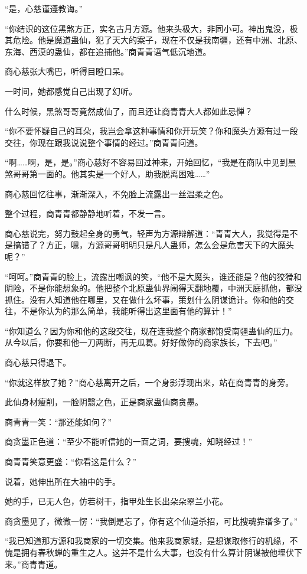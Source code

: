 \begin{this_body}
“是，心慈谨遵教诲。”

“你结识的这位黑煞方正，实名古月方源。他来头极大，非同小可。神出鬼没，极其危险。他是魔道蛊仙，犯了天大的案子，现在不仅是我南疆，还有中洲、北原、东海、西漠的蛊仙，都在追捕他。”商青青语气低沉地道。

商心慈张大嘴巴，听得目瞪口呆。

一时间，她都感觉自己出现了幻听。

什么时候，黑煞哥哥竟然成仙了，而且还让商青青大人都如此忌惮？

“你不要怀疑自己的耳朵，我岂会拿这种事情和你开玩笑？你和魔头方源有过一段交往，你现在跟我说说整个事情的经过。”商青青问道。

“啊……啊，是，是。”商心慈好不容易回过神来，开始回忆，“我是在商队中见到黑煞哥哥第一面的。他其实是一个好人，助我脱离困难……”

商心慈回忆往事，渐渐深入，不免脸上流露出一丝温柔之色。

整个过程，商青青都静静地听着，不发一言。

商心慈说完，努力鼓起全身的勇气，轻声为方源辩解道：“青青大人，我觉得是不是搞错了？方正，嗯，方源哥哥明明只是凡人蛊师，怎么会是危害天下的大魔头呢？”

“呵呵。”商青青的脸上，流露出嘲讽的笑，“他不是大魔头，谁还能是？他的狡猾和阴险，不是你能想象的。他把整个北原蛊仙界闹得天翻地覆，中洲天庭抓他，都没抓住。没有人知道他在哪里，又在做什么坏事，策划什么阴谋诡计。你和他的交往，不是你认为的那么简单，我能听得出这里面有他的算计！”

“你知道么？因为你和他的这段交往，现在连我整个商家都饱受南疆蛊仙的压力。从今以后，你要和他一刀两断，再无瓜葛。好好做你的商家族长，下去吧。”

商心慈只得退下。

“你就这样放了她？”商心慈离开之后，一个身影浮现出来，站在商青青的身旁。

此仙身材瘦削，一脸阴翳之色，正是商家蛊仙商贪墨。

商青青一笑：“那还能如何？”

商贪墨正色道：“至少不能听信她的一面之词，要搜魂，知晓经过！”

商青青笑意更盛：“你看这是什么？”

说着，她伸出所在大袖中的手。

她的手，已无人色，仿若树干，指甲处生长出朵朵翠兰小花。

商贪墨见了，微微一愣：“我倒是忘了，你有这个仙道杀招，可比搜魂靠谱多了。”

“我已知道那方源和我商家的一切交集。他来我商家城，是想谋取修行的机缘，不愧是拥有春秋蝉的重生之人。这并不是什么大事，也没有什么算计阴谋被他埋伏下来。”商青青道。


\end{this_body}
